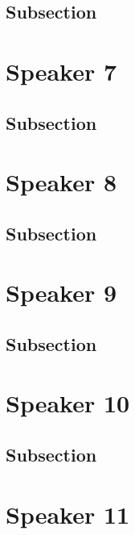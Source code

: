 \documentclass[
]{book}
\begin{document}
\hypertarget{subsection}{%
\section{Subsection}\label{subsection}}

\hypertarget{speaker-7}{%
\chapter*{Speaker 7}\label{speaker-7}}

\hypertarget{subsection}{%
\section{Subsection}\label{subsection}}

\hypertarget{speaker-8}{%
\chapter*{Speaker 8}\label{speaker-8}}

\hypertarget{subsection}{%
\section{Subsection}\label{subsection}}

\hypertarget{speaker-9}{%
\chapter*{Speaker 9}\label{speaker-9}}

\hypertarget{subsection}{%
\section{Subsection}\label{subsection}}

\hypertarget{speaker-10}{%
\chapter*{Speaker 10}\label{speaker-10}}

\hypertarget{subsection}{%
\section{Subsection}\label{subsection}}

\hypertarget{speaker-11}{%
\chapter*{Speaker 11}\label{speaker-11}}
\end{document}
